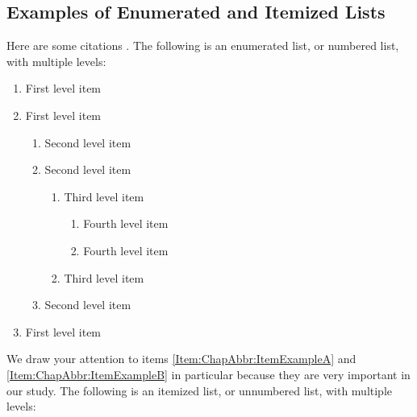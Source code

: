 
\subsection{Examples of Enumerated and Itemized Lists}
\label{Section:ChapAbbr:SomeExamples:Lists}

Here are some citations \cite{Examples:Conference03, Examples:Journal03, Examples:Conference04, Examples:Journal04, Examples:Conference05, Examples:Journal05}.
The following is an enumerated list, or numbered list, with multiple levels:

\begin{enumerate}
\item
\label{Item:ChapAbbr:ItemExampleA}
First level item
\item
First level item
\begin{enumerate}
\item
Second level item
\item
Second level item
\begin{enumerate}
\item
Third level item
\begin{enumerate}
\item
Fourth level item
\item
Fourth level item
\end{enumerate}
\item
Third level item
\end{enumerate}
\item
Second level item
\end{enumerate}
\item
\label{Item:ChapAbbr:ItemExampleB}
First level item
\end{enumerate}

We draw your attention to items \ref{Item:ChapAbbr:ItemExampleA} and \ref{Item:ChapAbbr:ItemExampleB} in particular because they are very important in our study.
The following is an itemized list, or unnumbered list, with multiple levels:


